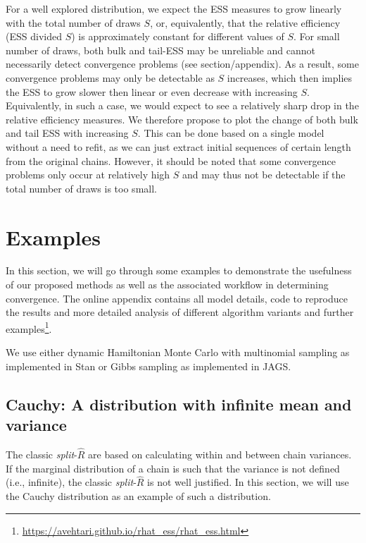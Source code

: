 \documentclass[american,]{article}
\let\rmarkdownfootnote\footnote%
\def\footnote{\protect\rmarkdownfootnote}
\begin{document}
For a well explored distribution, we expect the ESS measures to grow
linearly with the total number of draws \(S\), or, equivalently, that
the relative efficiency (ESS divided \(S\)) is approximately constant
for different values of \(S\). For small number of draws, both bulk and
tail-ESS may be unreliable and cannot necessarily detect convergence
problems (see section/appendix). As a result, some convergence problems may only be
detectable as \(S\) increases, which then implies the ESS to grow slower
then linear or even decrease with increasing \(S\). Equivalently, in
such a case, we would expect to see a relatively sharp drop in the
relative efficiency measures. We therefore propose to plot the change of
both bulk and tail ESS with increasing \(S\). This can be done based on
a single model without a need to refit, as we can just extract initial
sequences of certain length from the original chains. However, it should
be noted that some convergence problems only occur at relatively high
\(S\) and may thus not be detectable if the total number of draws is too
small.

\hypertarget{examples}{%
\section{Examples}\label{examples}}

In this section, we will go through some examples to demonstrate the
usefulness of our proposed methods as well as the associated workflow
in determining convergence. The online appendix contains all model
details, code to reproduce the results and more detailed analysis of
different algorithm variants and further
examples\footnote{\url{https://avehtari.github.io/rhat_ess/rhat_ess.html}}.

We use either dynamic Hamiltonian Monte Carlo with multinomial
sampling \citep{betancourt2017conceptual} as implemented in Stan
\citep{StanManual.2.18.0} or Gibbs sampling as implemented in JAGS.

\hypertarget{cauchy-a-distribution-with-infinite-mean-and-variance}{%
\subsection{Cauchy: A distribution with infinite mean and
variance}\label{cauchy-a-distribution-with-infinite-mean-and-variance}}

The classic \emph{split}-\(\widehat{R}\) are based on calculating
within and between chain variances. If the marginal distribution of a
chain is such that the variance is not defined (i.e., infinite), the
classic \emph{split}-\(\widehat{R}\) is not well justified. In this
section, we will use the Cauchy distribution as an example of such a
distribution. 
\end{document}
